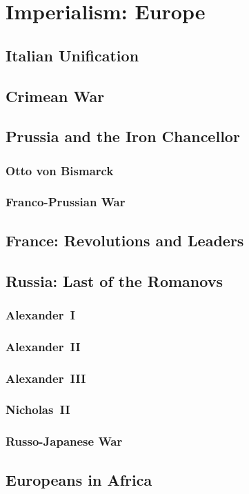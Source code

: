 \chapter{Imperialism: Europe}

\section{Italian Unification}

\section{Crimean War}

\section{Prussia and the Iron Chancellor}

\subsection*{Otto von Bismarck}

\subsection*{Franco-Prussian War}

\section{France: Revolutions and Leaders}

\section{Russia: Last of the Romanovs}

\subsection*{Alexander~I}

\subsection*{Alexander~II}

\subsection*{Alexander~III}

\subsection*{Nicholas~II}

\subsection*{Russo-Japanese War}

\section{Europeans in Africa}
